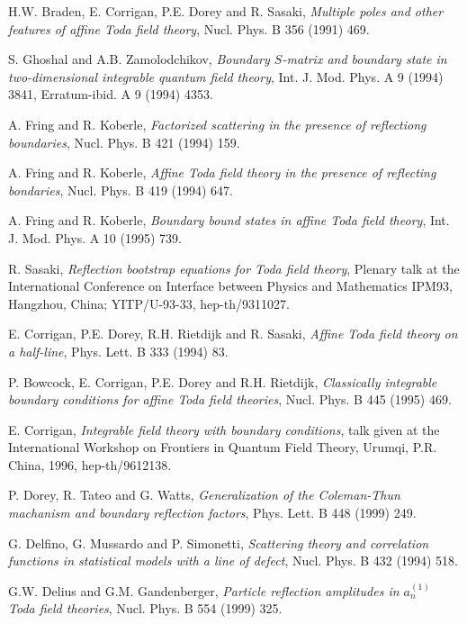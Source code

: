 \documentclass[a4paper,12pt]{report}
\begin{document}
\begin{thebibliography}{23}
 H.W. Braden, E. Corrigan, P.E. Dorey and R. Sasaki, \textit{Multiple poles and other features of
affine Toda field theory}, Nucl. Phys. B 356 (1991) 469.





 S. Ghoshal and A.B. Zamolodchikov, \textit{Boundary $S$-matrix and boundary state in two-dimensional integrable quantum field theory}, Int. J. Mod. Phys. A 9 (1994) 3841,
Erratum-ibid. A 9 (1994) 4353.

 A. Fring and R. Koberle, \textit{Factorized scattering in the presence of reflectiong boundaries}, Nucl. Phys. B 421 (1994) 159.

 A. Fring and R. Koberle, \textit{Affine Toda field theory in the presence of reflecting bondaries}, Nucl. Phys. B 419 (1994) 647.

 A. Fring and R. Koberle, \textit{Boundary bound states in affine Toda field theory}, Int. J. Mod. Phys. A 10 (1995) 739.

 R. Sasaki, {\it Reflection bootstrap equations for Toda field theory}, Plenary talk at the International
Conference on Interface between Physics and Mathematics IPM93, Hangzhou, China; YITP/U-93-33, hep-th/9311027.

 E. Corrigan, P.E. Dorey, R.H. Rietdijk and R. Sasaki, \textit{Affine Toda field theory on a half-line}, Phys. Lett. B 333 (1994) 83.

 P. Bowcock, E. Corrigan, P.E. Dorey and R.H. Rietdijk, \textit{Classically integrable boundary conditions for affine Toda field theories}, Nucl. Phys. B 445 (1995) 469.

 E. Corrigan, {\it Integrable field theory with boundary conditions}, talk given at the International Workshop
on Frontiers in Quantum Field Theory, Urumqi, P.R. China, 1996, hep-th/9612138.


 P. Dorey, R. Tateo and G. Watts, \textit{Generalization of the Coleman-Thun machanism and boundary reflection factors}, Phys. Lett. B 448 (1999) 249.

 G. Delfino, G. Mussardo and P. Simonetti, \textit{Scattering theory and correlation functions in statistical models with a line of defect}, Nucl. Phys. B 432 (1994) 518.

 G.W. Delius and G.M. Gandenberger, \textit{Particle reflection amplitudes in $a_{n}^{(1)}$ Toda field theories}, Nucl. Phys. B 554 (1999) 325.


\end{thebibliography}
\end{document}
